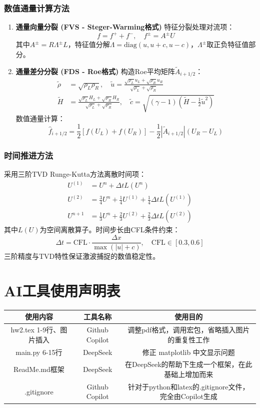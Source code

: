 \documentclass[UTF8]{ctexart}
\begin{document}
\subsubsection{数值通量计算方法}
\begin{enumerate}
    \item \textbf{通量向量分裂 (FVS - Steger-Warming格式)}  
    特征分裂处理对流项：
    $$f = f^+ + f^-,\quad f^\pm = A^\pm U$$
    其中$A^\pm = R\Lambda^\pm L$，特征值分解$\Lambda = \text{diag}(u,u+c,u-c)$，$\Lambda^\pm$取正负特征值部分。
    
    \item \textbf{通量差分分裂 (FDS - Roe格式)}  
    构造Roe平均矩阵$\tilde{A}_{i+1/2}$：
    \begin{align*}
    \tilde{\rho} &= \sqrt{\rho_L\rho_R},\quad \tilde{u} = \frac{\sqrt{\rho_L}u_L + \sqrt{\rho_R}u_R}{\sqrt{\rho_L} + \sqrt{\rho_R}} \\
    \tilde{H} &= \frac{\sqrt{\rho_L}H_L + \sqrt{\rho_R}H_R}{\sqrt{\rho_L} + \sqrt{\rho_R}},\quad \tilde{c} = \sqrt{(\gamma-1)\left(\tilde{H} - \frac{1}{2}\tilde{u}^2\right)}
    \end{align*}
    数值通量计算：
    $$\hat{f}_{i+1/2} = \frac{1}{2}\left[f(U_L)+f(U_R)\right] - \frac{1}{2}|\tilde{A}_{i+1/2}|(U_R - U_L)$$
\end{enumerate}

\subsubsection{时间推进方法}
采用三阶TVD Runge-Kutta方法离散时间项：
\begin{align*}
U^{(1)} &= U^n + \Delta t L(U^n) \\
U^{(2)} &= \frac{3}{4}U^n + \frac{1}{4}U^{(1)} + \frac{1}{4}\Delta t L(U^{(1)}) \\
U^{n+1} &= \frac{1}{3}U^n + \frac{2}{3}U^{(2)} + \frac{2}{3}\Delta t L(U^{(2)})
\end{align*}
其中$L(U)$为空间离散算子。时间步长由CFL条件约束：
$$\Delta t = \text{CFL}\cdot\frac{\Delta x}{\max(|u| + c)},\quad \text{CFL} \in [0.3, 0.6]$$
三阶精度与TVD特性保证激波捕捉的数值稳定性。



\newpage
\appendix
\section{AI工具使用声明表}
\begin{table}[H]
    \centering
    \begin{tabular}{c|c|c}
        \hline
        使用内容 & 工具名称 & 使用目的 \\ \hline
        hw2.tex 1-9行、图片插入 & Github Copilot & 调整pdf格式，调用宏包，省略插入图片的重复性工作 \\ 
        main.py 6-15行 & DeepSeek & 修正 matplotlib 中文显示问题 \\ 
        ReadMe.md框架 & DeepSeek & 在DeepSeek的帮助下生成一个框架，在此基础上增加而来 \\
        .gitignore & Github Copilot & 针对于python和latex的.gitignore文件，完全由Copilot生成  
    \end{tabular}
    \label{tab:AI_tools}
\end{table}
\end{document}
